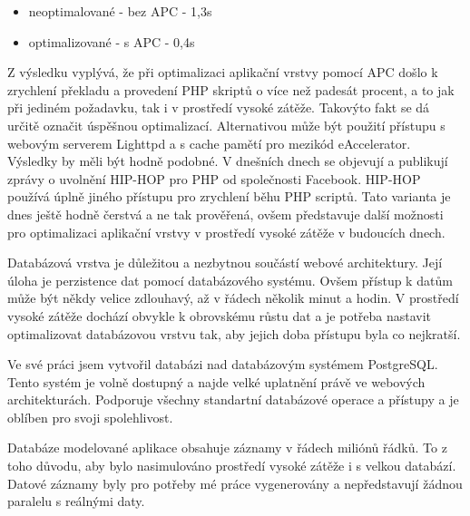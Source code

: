 \documentclass[12pt]{article}
\begin{document}
\begin{itemize}
\item neoptimalované - bez APC - 1,3s
\item optimalizované - s APC - 0,4s
\end{itemize}

Z výsledku vyplývá, že při optimalizaci aplikační vrstvy pomocí APC došlo k zrychlení překladu a provedení PHP skriptů o více než padesát procent, a to jak při jediném požadavku, tak i v prostředí vysoké zátěže. Takovýto fakt se dá určitě označit úspěšnou optimalizací. Alternativou může být použití přístupu s webovým serverem Lighttpd a s cache pamětí pro mezikód eAccelerator. Výsledky by měli být hodně podobné. V dnešních dnech se objevují a publikují zprávy o uvolnění HIP-HOP pro PHP od společnosti Facebook. HIP-HOP používá úplně jiného přístupu pro zrychlení běhu PHP scriptů. Tato varianta je dnes ještě hodně čerstvá a ne tak prověřená, ovšem představuje další možnosti pro optimalizaci aplikační vrstvy v prostředí vysoké zátěže v budoucích dnech.

\obrazek
{}

\obrazek
{}

\clearpage

\obrazek
{}



Databázová vrstva je důležitou a nezbytnou součástí webové architektury. Její úloha je perzistence dat pomocí databázového systému. Ovšem přístup k datům může být někdy velice zdlouhavý, až v řádech několik minut a hodin. V prostředí vysoké zátěže dochází obvykle k obrovskému růstu dat a je potřeba nastavit optimalizovat databázovou vrstvu tak, aby jejich doba přístupu byla co nejkratší.

Ve své práci jsem vytvořil databázi nad databázovým systémem PostgreSQL. Tento systém je volně dostupný a najde velké uplatnění právě ve webových architekturách. Podporuje všechny standartní databázové operace a přístupy a je oblíben pro svoji spolehlivost.

Databáze modelované aplikace obsahuje záznamy v řádech miliónů řádků. To z toho důvodu, aby bylo nasimulováno prostředí vysoké zátěže i s velkou databází. Datové záznamy byly pro potřeby mé práce vygenerovány a nepředstavují žádnou paralelu s reálnými daty.
\end{document}
